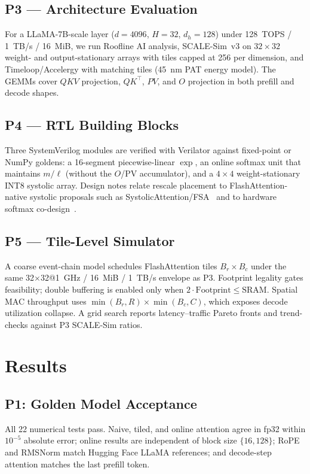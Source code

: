 \documentclass[conference]{IEEEtran}
\begin{document}
\subsection{P3 --- Architecture Evaluation}
For a LLaMA-7B-scale layer ($d{=}4096$, $H{=}32$, $d_h{=}128$) under 128~TOPS / 1~TB/s / 16~MiB, we run Roofline AI analysis, SCALE-Sim~v3 on $32\times32$ weight- and output-stationary arrays with tiles capped at 256 per dimension, and Timeloop/Accelergy with matching tiles (45~nm PAT energy model).
The GEMMs cover $QKV$ projection, $QK^\top$, $PV$, and $O$ projection in both prefill and decode shapes.

\subsection{P4 --- RTL Building Blocks}
Three SystemVerilog modules are verified with Verilator against fixed-point or NumPy goldens: a 16-segment piecewise-linear $\exp$, an online softmax unit that maintains $m/\ell$ (without the $O$/PV accumulator), and a $4\times4$ weight-stationary INT8 systolic array.
Design notes relate rescale placement to FlashAttention-native systolic proposals such as SystolicAttention/FSA~\cite{lin2025systolicattention} and to hardware softmax co-design~\cite{stevens2021softermax}.

\subsection{P5 --- Tile-Level Simulator}
A coarse event-chain model schedules FlashAttention tiles $B_r\times B_c$ under the same 32$\times$32@1~GHz / 16~MiB / 1~TB/s envelope as P3.
Footprint legality gates feasibility; double buffering is enabled only when $2\cdot\mathrm{Footprint}\le\mathrm{SRAM}$.
Spatial MAC throughput uses $\min(B_r,R)\times\min(B_c,C)$, which exposes decode utilization collapse.
A grid search reports latency--traffic Pareto fronts and trend-checks against P3 SCALE-Sim ratios.

\section{Results}
\label{sec:results}

\subsection{P1: Golden Model Acceptance}
All 22 numerical tests pass.
Naive, tiled, and online attention agree in fp32 within $10^{-5}$ absolute error; online results are independent of block size $\{16,128\}$; RoPE and RMSNorm match Hugging Face LLaMA references; and decode-step attention matches the last prefill token.
\end{document}
